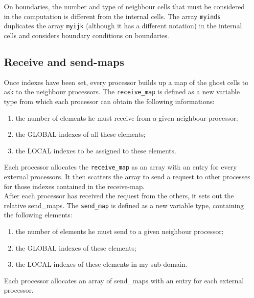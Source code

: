 On boundaries, the number and type of neighbour cells that must be considered
in the computation is different from the internal cells. The array
{\tt myinds} duplicates the array {\tt myijk} (although it has a different notation)
in the internal cells and considers boundary conditions on boundaries.\\ 
%
\subsection{Receive and send-maps}
%
Once indexes have been set, every processor builds up a map of the ghost cells
to ask to the neighbour processors. The {\tt receive\_map} is 
defined as a new variable type from which each processor can obtain the following informations:
\begin{enumerate}
\item the number of elements he must receive from a given neighbour processor;
\item the GLOBAL indexes of all these elements;
\item the LOCAL indexes to be assigned to these elements.
\end{enumerate}
Each processor allocates the {\tt receive\_map} as an array with an entry for every 
external processors. It then scatters the array to send a request to other 
processes for those indexes contained in the receive-map.\\
After each processor has received the request from the others,
it sets out the relative send\_maps. The {\tt send\_map} is defined as a new variable
type, containing the following elements:
\begin{enumerate}
\item the number of elements he must send to a given neighbour processor;
\item the GLOBAL indexes of these elements;
\item the LOCAL indexes of these elements in my sub-domain.
\end{enumerate}
Each processor allocates an array of send\_maps with an entry for each external processor.
%
